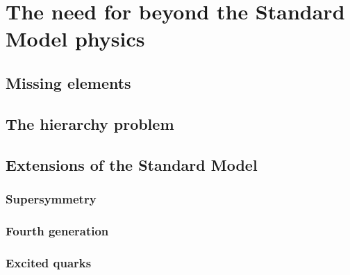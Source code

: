 \chapter{The need for beyond the Standard Model physics \label{chap:beyond_standard_model}}

\section{Missing elements \label{sec:missing_elements}}

\section{The hierarchy problem \label{sec:hierarchy_problem}}

\section{Extensions of the Standard Model \label{sec:extensions_standard_model}}

\subsection{Supersymmetry \label{sec:supersymmetry}}

\subsection{Fourth generation \label{sec:fourth_generation}}

\subsection{Excited quarks \label{sec:excited_quarks}}
